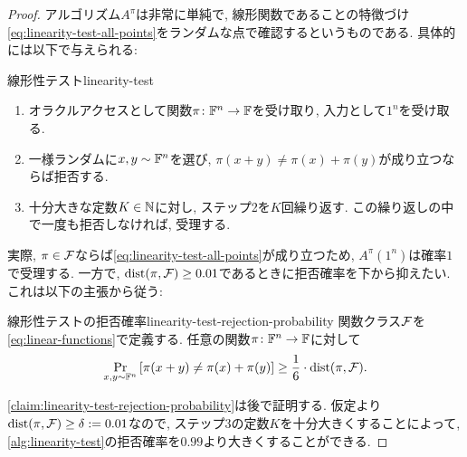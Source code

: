\begin{proof}
  アルゴリズム$A^\pi$は非常に単純で, 線形関数であることの特徴づけ\cref{eq:linearity-test-all-points}をランダムな点で確認するというものである.
  具体的には以下で与えられる:
  \begin{algorithm}{線形性テスト}{linearity-test}
    \begin{enumerate}
      \item オラクルアクセスとして関数$\pi\colon \mathbb{F}^n\to\mathbb{F}$を受け取り, 入力として$1^n$を受け取る.
      \item 一様ランダムに$x,y\sim\mathbb{F}^n$を選び, $\pi(x+y)\ne \pi(x)+\pi(y)$が成り立つならば拒否する.
      \item 十分大きな定数$K\in\mathbb{N}$に対し, ステップ2を$K$回繰り返す. この繰り返しの中で一度も拒否しなければ, 受理する.
    \end{enumerate}
  \end{algorithm}

  実際, $\pi\in\mathcal{F}$ならば\cref{eq:linearity-test-all-points}が成り立つため, $A^\pi(1^n)$は確率$1$で受理する.
  一方で, $\mathrm{dist}(\pi,\mathcal{F})\ge 0.01$であるときに拒否確率を下から抑えたい.
  これは以下の主張から従う:

  \begin{claim}{線形性テストの拒否確率}{linearity-test-rejection-probability}
    関数クラス$\mathcal{F}$を\cref{eq:linear-functions}で定義する.
    任意の関数$\pi\colon \mathbb{F}^n\to\mathbb{F}$に対して
    \begin{align*}
      \Pr_{x,y\sim\mathbb{F}^n}\qty[ \pi(x+y) \ne \pi(x)+\pi(y) ] \ge \frac{1}{6}\cdot \mathrm{dist}(\pi,\mathcal{F}).
    \end{align*}  
  \end{claim}

  \cref{claim:linearity-test-rejection-probability}は後で証明する.
  仮定より$\mathrm{dist}(\pi,\mathcal{F})\ge \delta:=0.01$なので,
  ステップ3の定数$K$を十分大きくすることによって, \cref{alg:linearity-test}の拒否確率を$0.99$より大きくすることができる.
  \end{proof}

